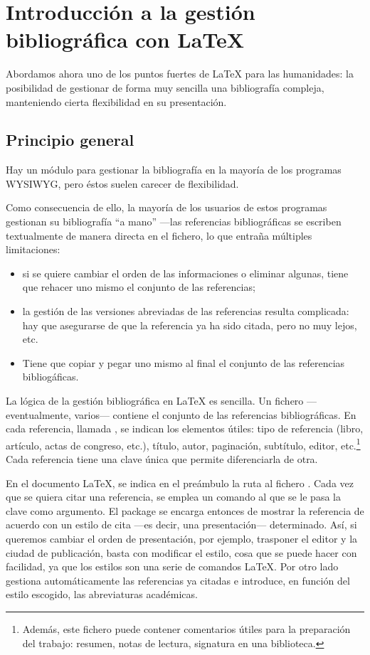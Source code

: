 \chapter[Introducción]{Introducción a la gestión bibliográfica con \LaTeX{}}
\begin{intro}
Abordamos ahora uno de los puntos fuertes de \LaTeX{} para las humanidades: la posibilidad de gestionar de forma muy sencilla una bibliografía compleja, manteniendo cierta flexibilidad en su presentación.

\end{intro}
\section{Principio general}

Hay un módulo para gestionar la bibliografía en la mayoría de los programas WYSIWYG, pero éstos suelen carecer de flexibilidad.

Como consecuencia de ello, la mayoría de los usuarios de estos programas gestionan su bibliografía \enquote{a mano} ---las referencias bibliográficas se escriben textualmente de manera directa en el fichero, lo que entraña múltiples limitaciones:
\begin{itemize}
\item si se quiere cambiar el orden de las informaciones o eliminar algunas, tiene que rehacer uno mismo el conjunto de las referencias;
\item la gestión de las versiones abreviadas de las referencias resulta complicada: hay que asegurarse de que la referencia ya ha sido citada, pero no muy lejos, etc.
\item Tiene que copiar y pegar uno mismo al final el conjunto de las referencias bibliogáficas. 
\end{itemize}

La lógica de la gestión bibliográfica en \LaTeX{} es sencilla. Un fichero  ---eventualmente, varios--- contiene el conjunto de las referencias bibliográficas. En cada referencia, llamada , se indican los elementos útiles:  tipo de referencia (libro, artículo, actas de congreso, etc.), título, autor, paginación, subtítulo, editor, etc.\footnote{Además, este fichero puede contener comentarios útiles para la preparación del trabajo: resumen, notas de lectura, signatura en una biblioteca.} Cada referencia tiene una clave única que permite diferenciarla de otra.

En el documento \LaTeX{}, se indica en el preámbulo la ruta al fichero . Cada vez que se quiera citar una referencia, se emplea un comando al que se le pasa la clave como argumento. El package  se encarga entonces de mostrar la referencia de acuerdo con un estilo de cita ---es decir, una presentación--- determinado. Así, si queremos cambiar el orden de presentación, por ejemplo, trasponer el editor y la ciudad de publicación, basta con modificar el estilo, cosa que se puede hacer con facilidad, ya que los estilos son una serie de comandos \LaTeX{}. Por otro lado  gestiona automáticamente las referencias ya citadas e introduce, en función del estilo escogido, las abreviaturas académicas. 

